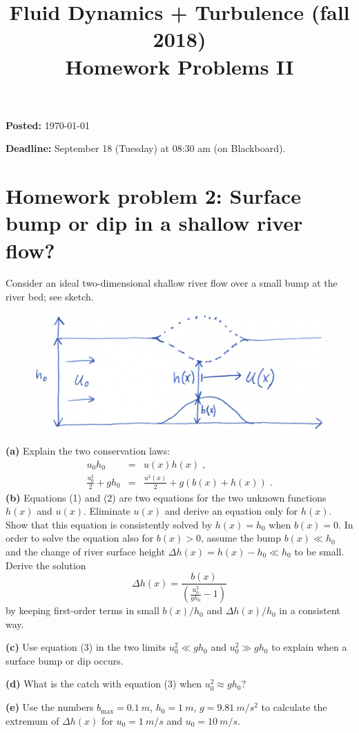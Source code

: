 \documentclass[a4paper, 10pt]{article}
\title{Fluid Dynamics + Turbulence (fall 2018)\\Homework Problems II}
\author{}
\date{}
\begin{document}
\maketitle

\large{
\textbf{Posted:}
\today

\bigskip
\textbf{Deadline:}
September 18 (Tuesday) at 08:30 am (on Blackboard).
}


\bigskip

\section*{Homework problem 2: Surface bump or dip in a shallow river flow?} 
Consider an ideal two-dimensional shallow river flow over a small bump at the river bed; see sketch.
\begin{figure}[h!]
	\centering
	\includegraphics[width=.7\textwidth]{bump.png}
\end{figure}

{\bf (a)} Explain the two conservation laws: 
\begin{eqnarray}
	u_0 h_0 &=& u(x) h(x) \; , \\
	\frac{u_0^2}{2} + g h_0 &=& \frac{u^2(x)}{2} + g \left( b(x) + h(x) \right) \; .
\end{eqnarray}
{\bf (b)} Equations (1) and (2) are two equations for the two unknown functions $h(x)$ and $u(x)$. Eliminate $u(x)$ and derive an equation only for $h(x)$. Show that this equation is consistently solved by $h(x)=h_0$ when $b(x)=0$. In order to solve the equation also for $b(x)>0$, assume the bump $b(x)\ll h_0$ and the change of river surface height $\Delta h(x) = h(x)-h_0\ll h_0$ to be small. Derive the solution
\begin{equation}
	\Delta h(x) = \frac{b(x)}{\left(\frac{u_0^2}{gh_0}-1\right)}
\end{equation}
by keeping first-order terms in small $b(x)/h_0$ and $\Delta h(x)/h_0$ in a consistent way. \newline

{\bf (c)} Use equation (3) in the two limits $u_0^2\ll gh_0$ and $u_ 0^2 \gg g h_0$ to explain when a surface bump or dip occurs. \newline

{\bf (d)} What is the catch with equation (3) when $u_0^2\approx gh_0$? \newline

{\bf (e)} Use the numbers $b_\mathrm{max}=\SI{0.1}{m}$, $h_0=\SI{1}{m}$, $g=\SI{9.81}{m/s^2}$ to calculate the extremum of $\Delta h(x)$ for $u_0=\SI{1}{m/s}$ and $u_0=\SI{10}{m/s}$.
\end{document}
